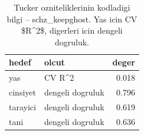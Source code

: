\begin{table}[htbp]
  \centering
  \caption{Tucker ozniteliklerinin kodladigi bilgi -- schz\_keepghost. Yas icin CV \$R\textasciicircum{}2\$, digerleri icin dengeli dogruluk.}
  \label{tab:content_schz_keepghost}
  \small
  \begin{tabular}{llr}
    \toprule
    hedef & olcut & deger \\
    \midrule
    yas & CV R\textasciicircum{}2 & 0.018 \\
    cinsiyet & dengeli dogruluk & 0.796 \\
    tarayici & dengeli dogruluk & 0.619 \\
    tani & dengeli dogruluk & 0.636 \\
    \bottomrule
  \end{tabular}
\end{table}
